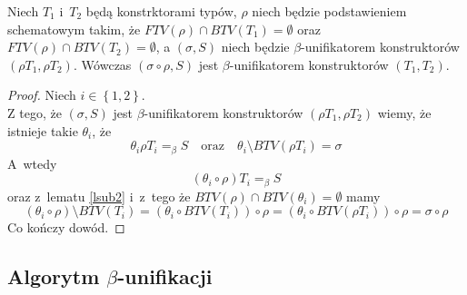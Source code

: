 \documentclass[11pt,leqno]{article}
\begin{document}
\begin{lemat}
Niech $T_1$ i~$T_2$ będą konstrktorami typów, $\rho$ niech będzie podstawieniem schematowym takim, że 
$FTV(\rho) \cap BTV(T_1) = \emptyset$ oraz $FTV(\rho) \cap BTV(T_2) = \emptyset$, a $(\sigma, S)$ niech będzie 
\mbox{$\beta$-unifikatorem} konstruktorów $(\rho T_1, \rho T_2)$.
Wówczas $(\sigma \circ \rho, S)$ jest $\beta$-unifikatorem konstruktorów $(T_1, T_2)$.
\label{lunif2}
\end{lemat}
\begin{proof}
Niech $i \in \left\{1,2\right\}$.\\
Z tego, że $(\sigma, S)$ jest $\beta$-unifikatorem konstruktorów $(\rho T_1, \rho T_2)$ wiemy, że istnieje takie
$\theta_i$, że
\[
\theta_i\rho T_i =_\beta S \quad \textrm{oraz} \quad \theta_i \setminus BTV(\rho T_i) = \sigma
\]
A~wtedy
\[
(\theta_i \circ \rho) T_i =_\beta S
\]
oraz z~lematu \ref{lsub2} i~z~tego że $BTV(\rho) \cap BTV(\theta_i) = \emptyset$ mamy
\[
(\theta_i \circ \rho) \setminus BTV(T_i) = (\theta_i \circ BTV(T_i)) \circ \rho = (\theta_i \circ BTV(\rho T_i)) \circ \rho = \sigma \circ \rho
\]
Co kończy dowód.
\end{proof}

\subsection{Algorytm $\beta$-unifikacji}
\end{document}
